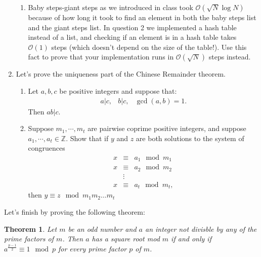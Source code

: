 \documentclass[11pt]{article}
\newtheorem{theorem}{Theorem}
\newcommand{\bZ}{\mathbb{Z}}
\newcommand{\cO}{\mathcal{O}}
\begin{document}
\begin{enumerate}
{\begin{enumerate}
{    }
    \item{
    Baby steps-giant steps as we introduced in class took $\cO(\sqrt N\log N)$ because of how long it took to find an element in both the baby steps list and the giant steps list.  In question 2 we implemented a hash table instead of a list, and checking if an element is in a hash table takes $\cO(1)$ steps (which doesn't depend on the size of the table!).  Use this fact to prove that your implementation runs in $\cO(\sqrt N)$ steps instead.
    }
  \end{enumerate}
  }
  \item{
  Let's prove the uniqueness part of the Chinese Remainder theorem.
  \begin{enumerate}
    \item{
    Let $a,b,c$ be positive integers and suppose that:
    \begin{eqnarray*}
      a|c,&b|c,&\gcd(a,b) = 1.
    \end{eqnarray*}
    Then $ab|c$.
    }
    \item{
    Suppose $m_1,\cdots,m_t$ are pairwise coprime positive integers, and suppose $a_1,\cdots,a_t\in\bZ$.  Show that if $y$ and $z$ are both solutions to the system of congruences
    \begin{eqnarray*}
      x&\equiv& a_1\mod m_1\\
      x&\equiv& a_2\mod m_2\\
      &\vdots&\\
      x&\equiv& a_t\mod m_t,
    \end{eqnarray*}
     then $y\equiv z\mod m_1m_2\dots m_t$
     }
   \end{enumerate}
  }
\end{enumerate}
  Let's finish by proving the following theorem:
\begin{theorem}\label{SquareRoots}
  Let $m$ be an odd number and $a$ an integer not divisble by any of the prime factors of $m$.  Then $a$ has a square root mod $m$ if and only if $a^{\frac{p-1}{2}}\equiv 1\mod p$ for every prime factor $p$ of $m$.
\end{theorem}
\end{document}

